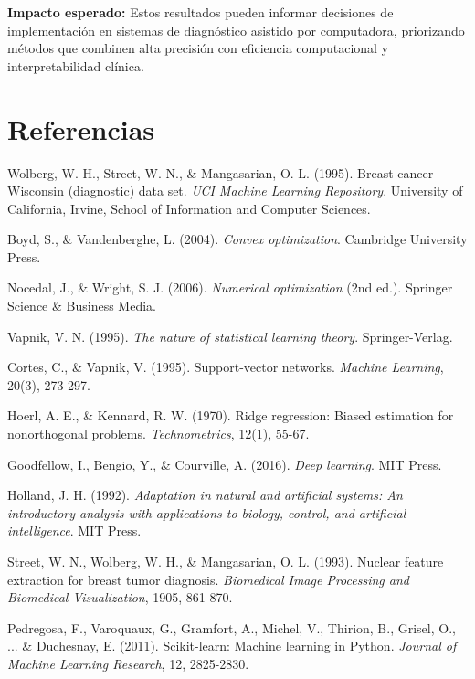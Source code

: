 \documentclass[12pt,a4paper]{article}
\begin{document}
\textbf{Impacto esperado:} Estos resultados pueden informar decisiones de implementación en sistemas de diagnóstico asistido por computadora, priorizando métodos que combinen alta precisión con eficiencia computacional y interpretabilidad clínica.

\section{Referencias}

\begin{thebibliography}{15}

 Wolberg, W. H., Street, W. N., \& Mangasarian, O. L. (1995). Breast cancer Wisconsin (diagnostic) data set. \textit{UCI Machine Learning Repository}. University of California, Irvine, School of Information and Computer Sciences.

 Boyd, S., \& Vandenberghe, L. (2004). \textit{Convex optimization}. Cambridge University Press.

 Nocedal, J., \& Wright, S. J. (2006). \textit{Numerical optimization} (2nd ed.). Springer Science \& Business Media.

 Vapnik, V. N. (1995). \textit{The nature of statistical learning theory}. Springer-Verlag.

 Cortes, C., \& Vapnik, V. (1995). Support-vector networks. \textit{Machine Learning}, 20(3), 273-297.

 Hoerl, A. E., \& Kennard, R. W. (1970). Ridge regression: Biased estimation for nonorthogonal problems. \textit{Technometrics}, 12(1), 55-67.

 Goodfellow, I., Bengio, Y., \& Courville, A. (2016). \textit{Deep learning}. MIT Press.

 Holland, J. H. (1992). \textit{Adaptation in natural and artificial systems: An introductory analysis with applications to biology, control, and artificial intelligence}. MIT Press.

 Street, W. N., Wolberg, W. H., \& Mangasarian, O. L. (1993). Nuclear feature extraction for breast tumor diagnosis. \textit{Biomedical Image Processing and Biomedical Visualization}, 1905, 861-870.

 Pedregosa, F., Varoquaux, G., Gramfort, A., Michel, V., Thirion, B., Grisel, O., ... \& Duchesnay, E. (2011). Scikit-learn: Machine learning in Python. \textit{Journal of Machine Learning Research}, 12, 2825-2830.


\end{thebibliography}
\end{document}
